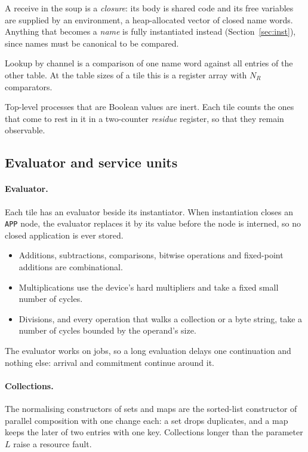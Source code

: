 \documentclass[11pt]{article}
\newcommand{\kw}[1]{\texttt{#1}}
\theoremstyle{definition}
\theoremstyle{remark}
\begin{document}
A receive in the soup is a \emph{closure}: its body is shared code and its
free variables are supplied by an environment, a heap-allocated vector of
closed name words. Anything that becomes a \emph{name} is fully instantiated
instead (Section~\ref{sec:inst}), since names must be canonical to be
compared.

Lookup by channel is a comparison of one name word against all entries of the
other table. At the table sizes of a tile this is a register array with $N_R$
comparators.

Top-level processes that are Boolean values are inert. Each tile counts the
ones that come to rest in it in a two-counter \emph{residue} register, so
that they remain observable.

\subsection{Evaluator and service units}\label{sec:evaluator}

\paragraph{Evaluator.} Each tile has an evaluator beside its instantiator.
When instantiation closes an \kw{APP} node, the evaluator replaces it by its
value before the node is interned, so no closed application is ever stored.
\begin{itemize}
\item Additions, subtractions, comparisons, bitwise operations and
fixed-point additions are combinational.
\item Multiplications use the device's hard multipliers and take a fixed
small number of cycles.
\item Divisions, and every operation that walks a collection or a byte
string, take a number of cycles bounded by the operand's size.
\end{itemize}
The evaluator works on jobs, so a long evaluation delays one continuation
and nothing else: arrival and commitment continue around it.

\paragraph{Collections.} The normalising constructors of sets and maps are
the sorted-list constructor of parallel composition with one change each: a
set drops duplicates, and a map keeps the later of two entries with one key.
Collections longer than the parameter $L$ raise a resource fault.
\end{document}
